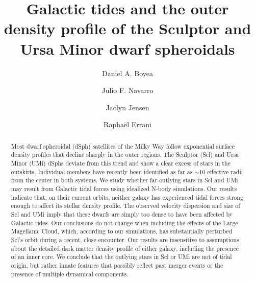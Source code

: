 \documentclass[linenumbers, twocolumn, twocolappendix]{aastex701}
\begin{document}
\title{Galactic tides and the outer density profile of the Sculptor and Ursa Minor dwarf spheroidals}



\author[orcid=0009-0008-8903-160X, gname='Daniel', sname='Boyea']{Daniel A. Boyea}


\author[0000-0003-3862-5076, gname='Julio', sname='Navarro']{Julio F. Navarro}

\author[0000-0002-4350-7632, gname='Jaclyn', sname='Jensen']{Jaclyn Jensen}

\author[]{Rapha\"el Errani}




\begin{abstract}
   Most dwarf spheroidal (dSph) satellites  of the Milky Way follow exponential surface density profiles that decline sharply in the outer regions. The Sculptor (Scl) and Ursa Minor (UMi) dSphs deviate from this trend and show a clear excess of stars in the outskirts. Individual members have recently been identified as far as ${\sim}10$ effective radii from the center in both systems.
   We study whether far-outlying stars in Scl and UMi may result from Galactic tidal forces using idealized N-body simulations.
   Our results indicate that, on their current orbits, neither galaxy has experienced tidal forces strong enough to affect its stellar density profile. The observed velocity dispersion and size of Scl and UMi imply that these dwarfs are simply too dense to have been affected by Galactic tides. Our conclusions do not change when including the effects of the Large Magellanic Cloud, which, according to our simulations, has substantially perturbed Scl's orbit during a recent, close encounter. Our results are insensitive to assumptions about the detailed dark matter density profile of either galaxy, including the presence of an inner core. 
  We conclude that the outlying stars in Scl or UMi are not of tidal origin, but rather innate features that possibly reflect past merger events or the presence of multiple dynamical components.
\end{abstract}
\end{document}
